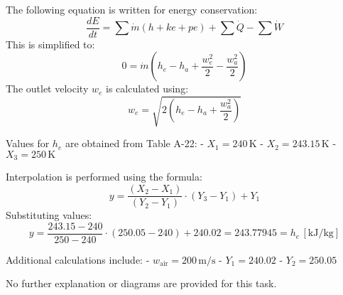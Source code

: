 The following equation is written for energy conservation:  
\[
\frac{dE}{dt} = \sum \dot{m} \left( h + ke + pe \right) + \sum \dot{Q} - \sum \dot{W}
\]  
This is simplified to:  
\[
0 = \dot{m} \left( h_e - h_a + \frac{w_e^2}{2} - \frac{w_a^2}{2} \right)
\]  
The outlet velocity \( w_e \) is calculated using:  
\[
w_e = \sqrt{2 \left( h_e - h_a + \frac{w_a^2}{2} \right)}
\]  

Values for \( h_e \) are obtained from Table A-22:  
- \( X_1 = 240 \, \text{K} \)  
- \( X_2 = 243.15 \, \text{K} \)  
- \( X_3 = 250 \, \text{K} \)  

Interpolation is performed using the formula:  
\[
y = \frac{(X_2 - X_1)}{(Y_2 - Y_1)} \cdot (Y_3 - Y_1) + Y_1
\]  
Substituting values:  
\[
y = \frac{243.15 - 240}{250 - 240} \cdot (250.05 - 240) + 240.02 = 243.77945 = h_e \, [\text{kJ/kg}]
\]  

Additional calculations include:  
- \( w_{\text{air}} = 200 \, \text{m/s} \)  
- \( Y_1 = 240.02 \)  
- \( Y_2 = 250.05 \)  

No further explanation or diagrams are provided for this task.